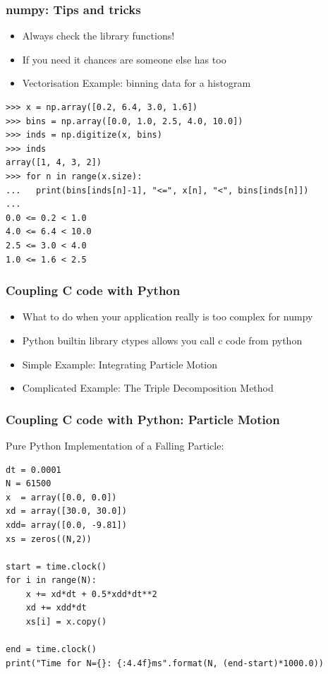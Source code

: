 \documentclass[landscape,10pt]{beamer}
\begin{document}
\begin{frame}[fragile]
\frametitle{numpy: Tips and tricks}
\begin{itemize}
\item Always check the library functions!
\item If you need it chances are someone else has too
\item Vectorisation Example: binning data for a histogram
\end{itemize}

\begin{scriptsize}
\begin{lstlisting}
>>> x = np.array([0.2, 6.4, 3.0, 1.6])
>>> bins = np.array([0.0, 1.0, 2.5, 4.0, 10.0])
>>> inds = np.digitize(x, bins)
>>> inds
array([1, 4, 3, 2])
>>> for n in range(x.size):
...   print(bins[inds[n]-1], "<=", x[n], "<", bins[inds[n]])
...
0.0 <= 0.2 < 1.0
4.0 <= 6.4 < 10.0
2.5 <= 3.0 < 4.0
1.0 <= 1.6 < 2.5
\end{lstlisting}
\end{scriptsize}

\end{frame}

\begin{frame}[fragile]
\frametitle{Coupling C code with Python}
\begin{itemize}
\item What to do when your application really is too complex for numpy
\item Python builtin library ctypes allows you call c code from python
\item Simple Example: Integrating Particle Motion
\item Complicated Example: The Triple Decomposition Method
\end{itemize}

\end{frame}

\begin{frame}[fragile]
\frametitle{Coupling C code with Python: Particle Motion}
Pure Python Implementation of a Falling Particle:
\begin{scriptsize}
\begin{lstlisting}
dt = 0.0001
N = 61500
x  = array([0.0, 0.0])
xd = array([30.0, 30.0])
xdd= array([0.0, -9.81])
xs = zeros((N,2))

start = time.clock()
for i in range(N):
    x += xd*dt + 0.5*xdd*dt**2
    xd += xdd*dt
    xs[i] = x.copy()

end = time.clock()
print("Time for N={}: {:4.4f}ms".format(N, (end-start)*1000.0))
\end{lstlisting}
\end{scriptsize}

\end{frame}
\end{document}
